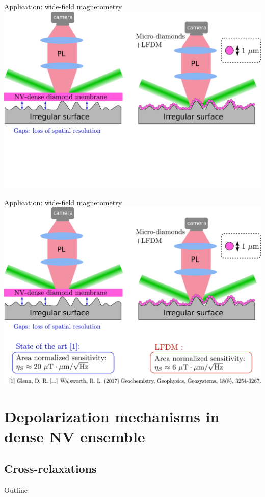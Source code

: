 \documentclass{beamer}
\begin{document}
\begin{frame}{Application: wide-field magnetometry}
\centering
\includegraphics[width=\textwidth,height=0.85\textheight,keepaspectratio]{Slide_applications_wide_field_f-1}
\end{frame}

\begin{frame}{Application: wide-field magnetometry}
\centering
\includegraphics[width=\textwidth,height=0.85\textheight,keepaspectratio]{Slide_applications_wide_field_f}
\end{frame}

\section{Depolarization mechanisms in dense NV ensemble}
\subsection{Cross-relaxations}
\begin{frame}{Outline}
\tableofcontents[currentsection]
\end{frame}
\end{document}
